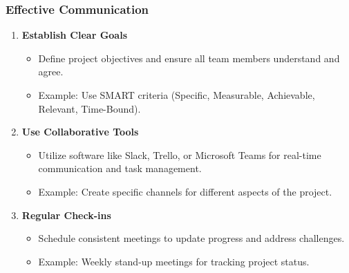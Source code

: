 \documentclass[aspectratio=169]{beamer}
\begin{document}
\begin{frame}[fragile]
    \frametitle{Effective Communication}
    \begin{enumerate}
        \item \textbf{Establish Clear Goals}
        \begin{itemize}
            \item Define project objectives and ensure all team members understand and agree.
            \item Example: Use SMART criteria (Specific, Measurable, Achievable, Relevant, Time-Bound).
        \end{itemize}
        
        \item \textbf{Use Collaborative Tools}
        \begin{itemize}
            \item Utilize software like Slack, Trello, or Microsoft Teams for real-time communication and task management.
            \item Example: Create specific channels for different aspects of the project.
        \end{itemize}
        
        \item \textbf{Regular Check-ins}
        \begin{itemize}
            \item Schedule consistent meetings to update progress and address challenges.
            \item Example: Weekly stand-up meetings for tracking project status.
        \end{itemize}
    \end{enumerate}
\end{frame}
\end{document}
